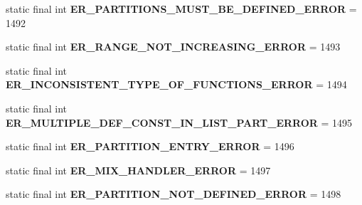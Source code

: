 \begin{DoxyCompactItemize}
static final int {\bfseries E\+R\+\_\+\+P\+A\+R\+T\+I\+T\+I\+O\+N\+S\+\_\+\+M\+U\+S\+T\+\_\+\+B\+E\+\_\+\+D\+E\+F\+I\+N\+E\+D\+\_\+\+E\+R\+R\+OR} = 1492
\item 
\mbox{\label{classcom_1_1mysql_1_1jdbc_1_1_mysql_error_numbers_a00f936a2313a44b7ba2829197c5adfd9}} 
static final int {\bfseries E\+R\+\_\+\+R\+A\+N\+G\+E\+\_\+\+N\+O\+T\+\_\+\+I\+N\+C\+R\+E\+A\+S\+I\+N\+G\+\_\+\+E\+R\+R\+OR} = 1493
\item 
\mbox{\label{classcom_1_1mysql_1_1jdbc_1_1_mysql_error_numbers_ab937fca3193ea0f74375714363cbae06}} 
static final int {\bfseries E\+R\+\_\+\+I\+N\+C\+O\+N\+S\+I\+S\+T\+E\+N\+T\+\_\+\+T\+Y\+P\+E\+\_\+\+O\+F\+\_\+\+F\+U\+N\+C\+T\+I\+O\+N\+S\+\_\+\+E\+R\+R\+OR} = 1494
\item 
\mbox{\label{classcom_1_1mysql_1_1jdbc_1_1_mysql_error_numbers_a24e9cd9f7f676d70714e9a09339c82ad}} 
static final int {\bfseries E\+R\+\_\+\+M\+U\+L\+T\+I\+P\+L\+E\+\_\+\+D\+E\+F\+\_\+\+C\+O\+N\+S\+T\+\_\+\+I\+N\+\_\+\+L\+I\+S\+T\+\_\+\+P\+A\+R\+T\+\_\+\+E\+R\+R\+OR} = 1495
\item 
\mbox{\label{classcom_1_1mysql_1_1jdbc_1_1_mysql_error_numbers_a6cc62b1b5923b2608e7e0db64cae1467}} 
static final int {\bfseries E\+R\+\_\+\+P\+A\+R\+T\+I\+T\+I\+O\+N\+\_\+\+E\+N\+T\+R\+Y\+\_\+\+E\+R\+R\+OR} = 1496
\item 
\mbox{\label{classcom_1_1mysql_1_1jdbc_1_1_mysql_error_numbers_abc1fd085a15217c2572b21e8131fc99a}} 
static final int {\bfseries E\+R\+\_\+\+M\+I\+X\+\_\+\+H\+A\+N\+D\+L\+E\+R\+\_\+\+E\+R\+R\+OR} = 1497
\item 
\mbox{\label{classcom_1_1mysql_1_1jdbc_1_1_mysql_error_numbers_a5883760216d0709e9323c73e194721f3}} 
static final int {\bfseries E\+R\+\_\+\+P\+A\+R\+T\+I\+T\+I\+O\+N\+\_\+\+N\+O\+T\+\_\+\+D\+E\+F\+I\+N\+E\+D\+\_\+\+E\+R\+R\+OR} = 1498
\item 
\mbox{\label{classcom_1_1mysql_1_1jdbc_1_1_mysql_error_numbers_a3420302cadc84f52e37c030e83ecbb10}} 

\end{DoxyCompactItemize}
